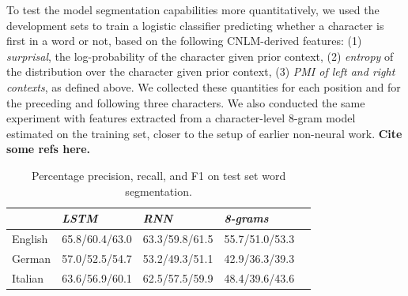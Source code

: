 To test the model segmentation capabilities more quantitatively, we
used the development sets to train a logistic classifier predicting whether a character is first
in a word or not, based on the following CNLM-derived features: (1)
\emph{surprisal}, the log-probability of the character given prior context, (2)
\emph{entropy} of the distribution over the character given prior
context, (3) \emph{PMI of left and right contexts}, as defined above.
We collected these quantities for each position and for the preceding and following three characters.
We also conducted the same experiment with features extracted from a
character-level 8-gram model estimated on the training set, closer to
the setup of earlier non-neural work. \textbf{Cite some refs here.}


\begin{table}[t]
  \begin{center}
    \begin{tabular}{l|l|l|l|l}
      \multicolumn{1}{c}{}&\emph{LSTM}&\emph{RNN}&\emph{8-grams}\\
      \hline
      English & 65.8/60.4/63.0 &   63.3/59.8/61.5 & 55.7/51.0/53.3    \\ %
      German &  57.0/52.5/54.7 &  53.2/49.3/51.1 & 42.9/36.3/39.3   \\ %
      Italian &  63.6/56.9/60.1 & 62.5/57.5/59.9  & 48.4/39.6/43.6    \\ %
    \end{tabular}
  \end{center}
  \caption{\label{tab:segmentation-results} Percentage precision, recall, and F1 on test set word segmentation.}
\end{table}

